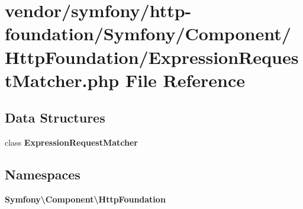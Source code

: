 \section{vendor/symfony/http-\/foundation/\+Symfony/\+Component/\+Http\+Foundation/\+Expression\+Request\+Matcher.php File Reference}
\label{_expression_request_matcher_8php}
\subsection*{Data Structures}
\begin{DoxyCompactItemize}
\item 
class {\bf Expression\+Request\+Matcher}
\end{DoxyCompactItemize}
\subsection*{Namespaces}
\begin{DoxyCompactItemize}
\item 
 {\bf Symfony\textbackslash{}\+Component\textbackslash{}\+Http\+Foundation}
\end{DoxyCompactItemize}
